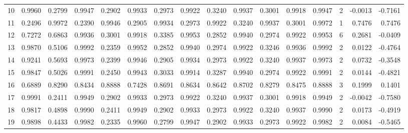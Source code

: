 \begin{tabular}{lrrrrrrrrrrrrrrr}
10 &      0.9960 &  0.2799 &  0.9947 &  0.2902 &  0.9933 &  0.2973 &  0.9922 &  0.3240 &  0.9937 &  0.3001 &   0.9918 &     0.9947 &      2 &                   -0.0013 &                    -0.7161 \\
11 &      0.2496 &  0.9972 &  0.2390 &  0.9946 &  0.2905 &  0.9934 &  0.2973 &  0.9922 &  0.3240 &  0.9937 &   0.3001 &     0.9972 &      1 &                    0.7476 &                     0.7476 \\
12 &      0.7272 &  0.6863 &  0.9936 &  0.3001 &  0.9918 &  0.3385 &  0.9953 &  0.2852 &  0.9940 &  0.2974 &   0.9922 &     0.9953 &      6 &                    0.2681 &                    -0.0409 \\
13 &      0.9870 &  0.5106 &  0.9992 &  0.2359 &  0.9952 &  0.2852 &  0.9940 &  0.2974 &  0.9922 &  0.3246 &   0.9936 &     0.9992 &      2 &                    0.0122 &                    -0.4764 \\
14 &      0.9241 &  0.5693 &  0.9973 &  0.2399 &  0.9946 &  0.2905 &  0.9934 &  0.2973 &  0.9922 &  0.3240 &   0.9937 &     0.9973 &      2 &                    0.0732 &                    -0.3548 \\
15 &      0.9847 &  0.5026 &  0.9991 &  0.2450 &  0.9943 &  0.3033 &  0.9914 &  0.3287 &  0.9940 &  0.2974 &   0.9922 &     0.9991 &      2 &                    0.0144 &                    -0.4821 \\
16 &      0.6889 &  0.8290 &  0.8434 &  0.8888 &  0.7428 &  0.8691 &  0.8634 &  0.8642 &  0.8702 &  0.8279 &   0.8475 &     0.8888 &      3 &                    0.1999 &                     0.1401 \\
17 &      0.9991 &  0.2411 &  0.9949 &  0.2902 &  0.9933 &  0.2973 &  0.9922 &  0.3240 &  0.9937 &  0.3001 &   0.9918 &     0.9949 &      2 &                   -0.0042 &                    -0.7580 \\
18 &      0.9817 &  0.4898 &  0.9990 &  0.2411 &  0.9949 &  0.2902 &  0.9933 &  0.2973 &  0.9922 &  0.3240 &   0.9937 &     0.9990 &      2 &                    0.0173 &                    -0.4919 \\
19 &      0.9898 &  0.4433 &  0.9982 &  0.2335 &  0.9960 &  0.2799 &  0.9947 &  0.2902 &  0.9933 &  0.2973 &   0.9922 &     0.9982 &      2 &                    0.0084 &                    -0.5465 \\
\bottomrule
\end{tabular}
